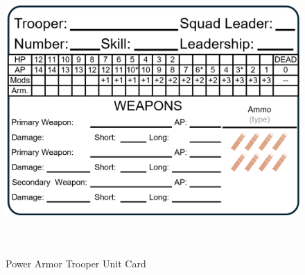 \begin{figure}[!h]
  \centering
  \includegraphics[alt='Sample Power Armor Trooper', width=5.63in, height=4in]{img/PowerArmorTrooper.png}
  \caption*{Power Armor Trooper Unit Card}
\end{figure}

